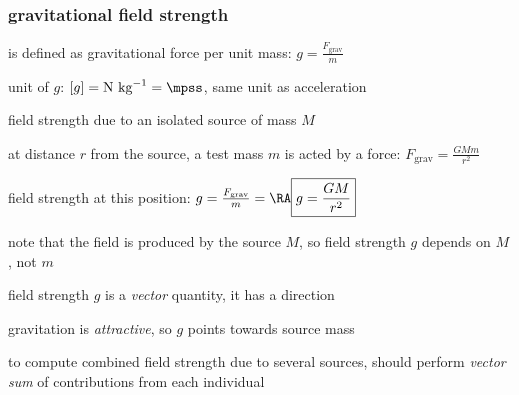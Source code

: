 \subsubsection{gravitational field strength}

\rcyskip

\begin{ilight}
	 is defined as gravitational force per unit mass: $\boxed{g=\frac{F_\text{grav}}{m}}$
\end{ilight}

\cmt unit of $g$: $[g]=\text{N kg}^{-1} = \mpss$, same unit as acceleration

\cmt field strength due to an isolated source of mass $M$

at distance $r$ from the source, a test mass $m$ is acted by a force: $F_\text{grav} = \frac{GMm}{r^2}$

field strength at this position: $g = \frac{F_\text{grav}}{m} = \RA \boxed{g=\frac{GM}{r^2}}$

note that the field is produced by the source $M$, so field strength $g$ depends on $M$, not $m$

\cmt field strength $g$ is a \emph{vector} quantity, it has a direction

gravitation is \emph{attractive}, so $g$ points towards source mass

to compute combined field strength due to several sources, should perform \emph{vector sum} of contributions from each individual


\begin{center}
\end{center}

